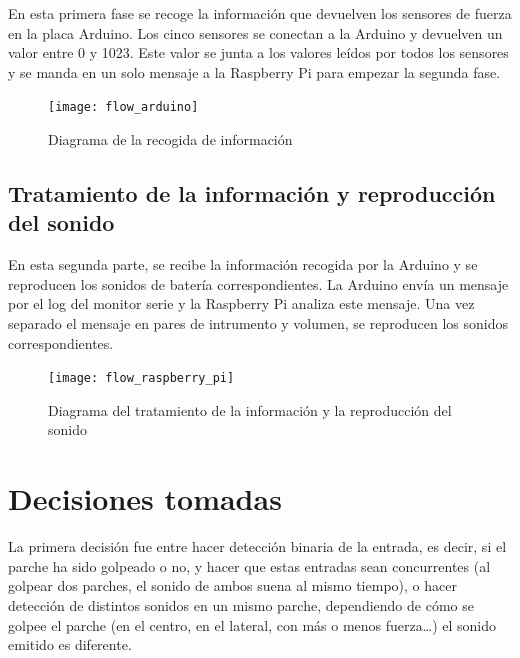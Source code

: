             En esta primera fase se recoge la información que devuelven los sensores de fuerza en la placa Arduino. Los
            cinco sensores se conectan a la Arduino y devuelven un valor entre 0 y 1023. Este valor se junta a los
            valores leídos por todos los sensores y se manda en un solo mensaje a la Raspberry Pi para empezar la
            segunda fase.
            
            \newpage

            \begin{figure}[ht]
                \centering
                \texttt{[image: flow\_arduino]}
                \caption{Diagrama de la recogida de información \label{fig:DiagramaRecogida}}
            \end{figure}


        \subsection{Tratamiento de la información y reproducción del sonido} %
        \label{sub:TratamientoDeLaInformacionYReproduccionDelSonido}

            En esta segunda parte, se recibe la información recogida por la Arduino y se reproducen los sonidos de
            batería correspondientes. La Arduino envía un mensaje por el log del monitor serie y la Raspberry Pi analiza
            este mensaje. Una vez separado el mensaje en pares de intrumento y volumen, se reproducen los sonidos
            correspondientes.

            \begin{figure}[ht]
                \centering
                \texttt{[image: flow\_raspberry\_pi]}
                \caption{Diagrama del tratamiento de la información y la reproducción del
                sonido \label{fig:DiagramaTratamiento}}
            \end{figure}



    \section{Decisiones tomadas} %
    \label{sec:DecisionesTomadas}

        La primera decisión fue entre hacer detección binaria de la entrada, es decir, si el parche ha sido golpeado o
        no, y hacer que estas entradas sean concurrentes (al golpear dos parches, el sonido de ambos suena al mismo
        tiempo), o hacer detección de distintos sonidos en un mismo parche, dependiendo de cómo se golpee el parche (en
        el centro, en el lateral, con más o menos fuerza…) el sonido emitido es diferente.

